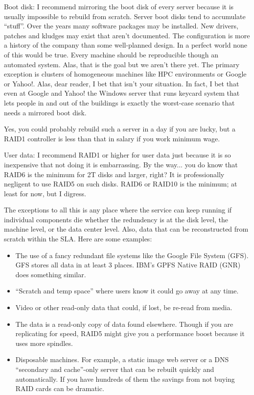 \documentclass{article}
\begin{document}
Boot disk: I recommend mirroring the boot disk of every server because it is usually impossible to rebuild from scratch. Server boot disks tend to accumulate ``stuff''. Over the years many software packages may be installed. New drivers, patches and kludges may exist that aren't documented. The configuration is more a history of the company than some well-planned design. In a perfect world none of this would be true. Every machine should be reproducible though an automated system. Alas, that is the goal but we aren't there yet. The primary exception is clusters of homogeneous machines like HPC environments or Google or Yahoo!. Alas, dear reader, I bet that isn't your situation. In fact, I bet that even at Google and Yahoo! the Windows server that runs keycard system that lets people in and out of the buildings is exactly the worst-case scenario that needs a mirrored boot disk.

Yes, you could probably rebuild such a server in a day if you are lucky, but a RAID1 controller is less than that in salary if you work minimum wage.

User data: I recommend RAID1 or higher for user data just because it is so inexpensive that not doing it is embarrassing. By the way... you do know that RAID6 is the minimum for 2T disks and larger, right? It is professionally negligent to use RAID5 on such disks. RAID6 or RAID10 is the minimum; at least for now, but I digress.

The exceptions to all this is any place where the service can keep running if individual components die whether the redundency is at the disk level, the machine level, or the data center level. Also, data that can be reconstructed from scratch within the SLA. Here are some examples:

\begin{itemize}
    \item The use of a fancy redundant file systems like the Google File System (GFS). GFS stores all data in at least 3 places. IBM's GPFS Native RAID (GNR) does something similar.
    \item ``Scratch and temp space'' where users know it could go away at any time.
    \item Video or other read-only data that could, if lost, be re-read from media.
    \item The data is a read-only copy of data found elsewhere. Though if you are replicating for speed, RAID5 might give you a performance boost because it uses more spindles.
    \item Disposable machines. For example, a static image web server or a DNS ``secondary and cache''-only server that can be rebuilt quickly and automatically. If you have hundreds of them the savings from not buying RAID cards can be dramatic.
\end{itemize}
\end{document}
